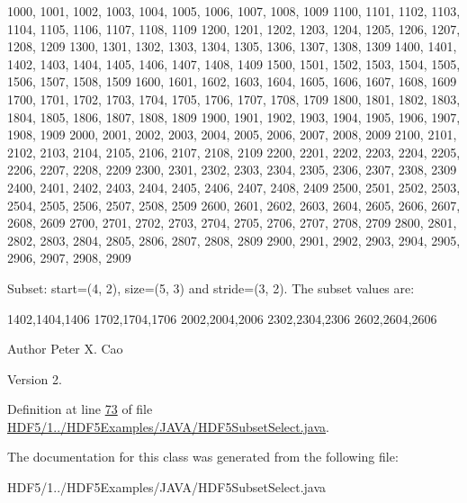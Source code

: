 \begin{DoxyPre}
1000, 1001, 1002, 1003, 1004, 1005, 1006, 1007, 1008, 1009
1100, 1101, 1102, 1103, 1104, 1105, 1106, 1107, 1108, 1109
1200, 1201, 1202, 1203, 1204, 1205, 1206, 1207, 1208, 1209
1300, 1301, 1302, 1303, 1304, 1305, 1306, 1307, 1308, 1309
1400, 1401, 1402, 1403, 1404, 1405, 1406, 1407, 1408, 1409
1500, 1501, 1502, 1503, 1504, 1505, 1506, 1507, 1508, 1509
1600, 1601, 1602, 1603, 1604, 1605, 1606, 1607, 1608, 1609
1700, 1701, 1702, 1703, 1704, 1705, 1706, 1707, 1708, 1709
1800, 1801, 1802, 1803, 1804, 1805, 1806, 1807, 1808, 1809
1900, 1901, 1902, 1903, 1904, 1905, 1906, 1907, 1908, 1909
2000, 2001, 2002, 2003, 2004, 2005, 2006, 2007, 2008, 2009
2100, 2101, 2102, 2103, 2104, 2105, 2106, 2107, 2108, 2109
2200, 2201, 2202, 2203, 2204, 2205, 2206, 2207, 2208, 2209
2300, 2301, 2302, 2303, 2304, 2305, 2306, 2307, 2308, 2309
2400, 2401, 2402, 2403, 2404, 2405, 2406, 2407, 2408, 2409
2500, 2501, 2502, 2503, 2504, 2505, 2506, 2507, 2508, 2509
2600, 2601, 2602, 2603, 2604, 2605, 2606, 2607, 2608, 2609
2700, 2701, 2702, 2703, 2704, 2705, 2706, 2707, 2708, 2709
2800, 2801, 2802, 2803, 2804, 2805, 2806, 2807, 2808, 2809
2900, 2901, 2902, 2903, 2904, 2905, 2906, 2907, 2908, 2909
\end{DoxyPre}


Subset\+: start=(4, 2), size=(5, 3) and stride=(3, 2). The subset values are\+:


\begin{DoxyPre}
1402,1404,1406
1702,1704,1706
2002,2004,2006
2302,2304,2306
2602,2604,2606
\end{DoxyPre}


\begin{DoxyAuthor}{Author}
Peter X. Cao 
\end{DoxyAuthor}
\begin{DoxyVersion}{Version}
2. 
\end{DoxyVersion}


Definition at line \hyperlink{_h_d_f5_21_810_81_2_h_d_f5_examples_2_j_a_v_a_2_h_d_f5_subset_select_8java_source_l00073}{73} of file \hyperlink{_h_d_f5_21_810_81_2_h_d_f5_examples_2_j_a_v_a_2_h_d_f5_subset_select_8java_source}{H\+D\+F5/1../\+H\+D\+F5\+Examples/\+J\+A\+V\+A/\+H\+D\+F5\+Subset\+Select.\+java}.



The documentation for this class was generated from the following file\+:\begin{DoxyCompactItemize}
\item 
H\+D\+F5/1../\+H\+D\+F5\+Examples/\+J\+A\+V\+A/\+H\+D\+F5\+Subset\+Select.\+java\end{DoxyCompactItemize}
